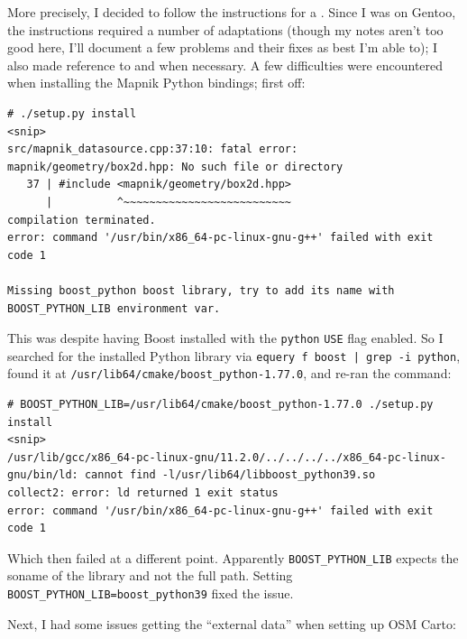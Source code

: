 \documentclass{article}
\begin{document}
More precisely, I decided to follow the instructions for a .  Since I was on Gentoo, the instructions required a number of adaptations (though my notes aren't too good here, I'll document a few problems and their fixes as best I'm able to); I also made reference to  and  when necessary.  A few difficulties were encountered when installing the Mapnik Python bindings; first off:

\begin{verbatim}
# ./setup.py install
<snip>
src/mapnik_datasource.cpp:37:10: fatal error: mapnik/geometry/box2d.hpp: No such file or directory
   37 | #include <mapnik/geometry/box2d.hpp>
      |          ^~~~~~~~~~~~~~~~~~~~~~~~~~~
compilation terminated.
error: command '/usr/bin/x86_64-pc-linux-gnu-g++' failed with exit code 1

Missing boost_python boost library, try to add its name with BOOST_PYTHON_LIB environment var.
\end{verbatim}

This was despite having Boost installed with the \texttt{python} \texttt{USE} flag enabled.  So I searched for the installed Python library via \texttt{equery f boost | grep -i python}, found it at \texttt{/usr/lib64/cmake/boost_python-1.77.0}, and re-ran the command:

\begin{verbatim}
# BOOST_PYTHON_LIB=/usr/lib64/cmake/boost_python-1.77.0 ./setup.py install
<snip>
/usr/lib/gcc/x86_64-pc-linux-gnu/11.2.0/../../../../x86_64-pc-linux-gnu/bin/ld: cannot find -l/usr/lib64/libboost_python39.so
collect2: error: ld returned 1 exit status
error: command '/usr/bin/x86_64-pc-linux-gnu-g++' failed with exit code 1
\end{verbatim}

Which then failed at a different point.  Apparently \texttt{BOOST_PYTHON_LIB} expects the soname of the library and not the full path.  Setting \texttt{BOOST_PYTHON_LIB=boost_python39} fixed the issue.

Next, I had some issues getting the ``external data'' when setting up OSM Carto:
\end{document}
